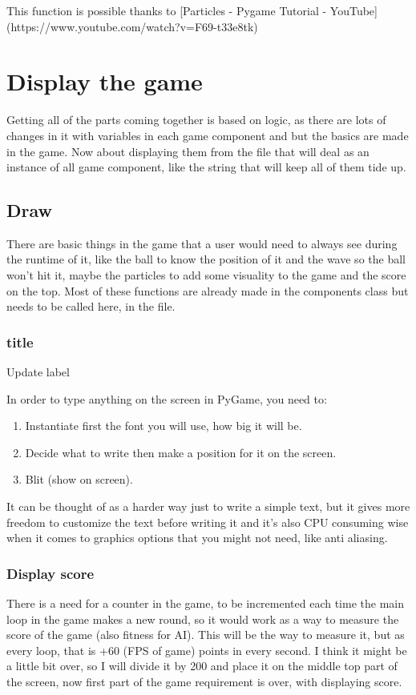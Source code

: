 This function is possible thanks to [Particles - Pygame Tutorial - YouTube](https://www.youtube.com/watch?v=F69-t33e8tk)

\section{Display the game}\label{display-the-game}
Getting all of the parts coming together is based on logic, as there are lots of changes in it with variables in each game component  and  but the basics are made in the game. Now about displaying them from the  file that will deal as an instance of all game component, like the string that will keep all of them tide up.

\subsection{Draw}\label{draw}
There are basic things in the game that a user would need to always see during the runtime of it, like the ball to know the position of it and the wave so the ball won't hit it, maybe the particles to add some visuality to the game and the score on the top. Most of these functions are already made in the components class but needs to be called here, in the  file.

\subsubsection{title}{Update label}

In order to type anything on the screen in PyGame, you need to:
\begin{enumerate}
	\item Instantiate first the font you will use, how big it will be.
	\item Decide what to write then make a position for it on the screen.
	\item Blit (show on screen).
\end{enumerate}

It can be thought of as a harder way just to write a simple text, but it gives more freedom to customize the text before writing it and it's also CPU consuming wise when it comes to graphics options that you might not need, like anti aliasing.

\subsubsection{Display score} \label{display-score}
There is a need for a counter in the game, to be incremented each time the main  loop in the game makes a new round, so it would work as a way  to measure the score of the game (also fitness for AI). This  will be the way to measure it, but as every loop, that is +60 (FPS of game) points in every second. I think it might be a little bit over, so I will divide it by 200 and place it on the middle top part of the screen, now first part of the game requirement is over, with displaying score.

